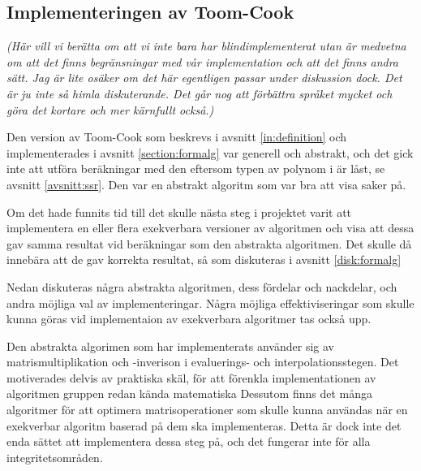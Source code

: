 \subsection{Implementeringen av Toom-Cook}
\emph{(Här vill vi berätta om att vi inte bara har blindimplementerat utan är medvetna
om att det finns begränsningar med vår implementation och att det finns andra sätt. Jag är
lite osäker om det här egentligen passar under diskussion dock. Det är ju inte så himla
diskuterande. Det går nog att förbättra språket mycket och göra det kortare och mer kärnfullt också.)}

Den version av Toom-Cook som beskrevs i avsnitt \ref{in:definition} och
implementerades i avsnitt \ref{section:formalg} var generell och abstrakt,
och det gick inte att utföra beräkningar med den eftersom typen av polynom i \ssr är låst,
se avsnitt \ref{avsnitt:ssr}. Den var en abstrakt algoritm som var bra att
visa saker på.

Om det hade funnits tid till det skulle nästa steg i projektet varit att implementera
en eller flera exekverbara versioner av algoritmen och visa att dessa
gav samma resultat vid beräkningar som den abstrakta algoritmen. Det skulle då
innebära att de gav
korrekta resultat, så som diskuteras i avsnitt \ref{disk:formalg}

Nedan diskuteras några  abstrakta
algoritmen, dess fördelar och nackdelar, och andra möjliga val av implementeringar.
Några möjliga effektiviseringar som skulle kunna göras vid
implementaion av exekverbara algoritmer tas också upp.

Den abstrakta algorimen som har implementerats använder sig av matrismultiplikation
och -inverison
i evaluerings- och interpolationsstegen. Det motiverades delvis av praktiska
skäl, för att förenkla implementationen av algoritmen gruppen redan kända matematiska
Dessutom finns det många algoritmer för att optimera matrisoperationer som skulle kunna
användas när en exekverbar algoritm baserad på dem ska implementeras. Detta är dock
inte det enda sättet att implementera dessa steg på, och det fungerar inte för
alla integritetsområden.



